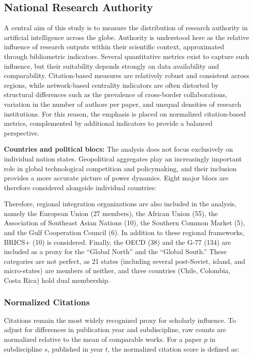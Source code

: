 \documentclass{article}
\begin{document}
\subsection{National Research Authority}

A central aim of this study is to measure the distribution of research authority in artificial intelligence across the globe. Authority is understood here as the relative influence of research outputs within their scientific context, approximated through bibliometric indicators. Several quantitative metrics exist to capture such influence, but their suitability depends strongly on data availability and comparability. Citation-based measures are relatively robust and consistent across regions, while network-based centrality indicators are often distorted by structural differences such as the prevalence of cross-border collaborations, variation in the number of authors per paper, and unequal densities of research institutions. For this reason, the emphasis is placed on normalized citation-based metrics, complemented by additional indicators to provide a balanced perspective.

\textbf{Countries and political blocs:}  
The analysis does not focus exclusively on individual nation states. Geopolitical aggregates play an increasingly important role in global technological competition and policymaking, and their inclusion provides a more accurate picture of power dynamics. Eight major blocs are therefore considered alongside individual countries:  

Therefore, regional integration organizations are also included in the analysis, namely the European Union (27 members), the African Union (55), the Association of Southeast Asian Nations (10), the Southern Common Market (5), and the Gulf Cooperation Council (6). In addition to these regional frameworks, BRICS+ (10) is considered. Finally, the OECD (38) and the G-77 (134) are included as a proxy for the “Global North” and the “Global South.” These categories are not perfect, as 21 states (including several post-Soviet, island, and micro-states) are members of neither, and three countries (Chile, Colombia, Costa Rica) hold dual membership.


\subsubsection{Normalized Citations}

Citations remain the most widely recognized proxy for scholarly influence. To adjust for differences in publication year and subdiscipline, raw counts are normalized relative to the mean of comparable works. For a paper \(p\) in subdiscipline \(s\), published in year \(t\), the normalized citation score is defined as:
\end{document}
